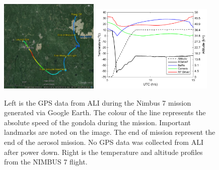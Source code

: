 \documentclass[12pt]{article}
\begin{document}
\newpage

\begin{figure}
    \includegraphics[width=0.42\textwidth]{./Images/5-1-AliGpsDataGoogleMaps.jpg}
    \includegraphics[width=0.52\textwidth]{./Images/5-1-FlightTemperatures.pdf}
    \caption{Left is the GPS data from ALI during the Nimbus 7 mission generated via Google Earth. The colour of the line represents the absolute speed of the gondola during the mission. Important landmarks are noted on the image. The end of mission represent the end of the aerosol mission. No GPS data was collected from ALI after power down. Right is the temperature and altitude profiles from the NIMBUS 7 flight.}
    \label{fig:5.1:nimbus7FlightPath}
\end{figure}



\newpage
\end{document}
